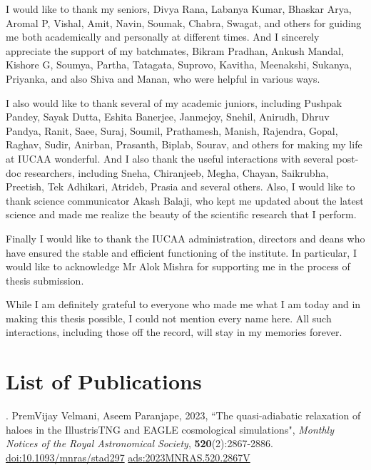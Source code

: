 \documentclass[a4paper, 12pt, oneside]{Thesis}  %
\newcommand{\doi}[1]{\href{https://doi.org/#1}{doi:#1}}
\begin{document}
{I would like to thank my seniors, Divya Rana, Labanya Kumar, Bhaskar Arya, Aromal P, Vishal, Amit, Navin, Soumak, Chabra, Swagat, and others for guiding me both academically and personally at different times. And I sincerely appreciate the support of my batchmates, Bikram Pradhan, Ankush Mandal, Kishore G, Soumya, Partha, Tatagata, Suprovo, Kavitha, Meenakshi, Sukanya, Priyanka, and also Shiva and Manan, who were helpful in various ways.

I also would like to thank several of my academic juniors, including Pushpak Pandey, Sayak Dutta, Eshita Banerjee, Janmejoy, Snehil, Anirudh, Dhruv Pandya, Ranit, Saee, Suraj, Soumil, Prathamesh, Manish, Rajendra, Gopal, Raghav, Sudir, Anirban, Prasanth, Biplab, Sourav, and others for making my life at IUCAA wonderful. And I also thank the useful interactions with several post-doc researchers, including Sneha, Chiranjeeb, Megha, Chayan, Saikrubha, Preetish, Tek Adhikari, Atrideb, Prasia and several others.
Also, I would like to thank science communicator Akash Balaji, who kept me updated about the latest science and made me realize the beauty of the scientific research that I perform.

Finally I would like to thank the IUCAA administration, directors and deans who have ensured the stable and efficient functioning of the institute. In particular, I would like to acknowledge Mr Alok Mishra for supporting me in the process of thesis submission.

While I am definitely grateful to everyone who made me what I am today and in making this thesis possible, I could not mention every name here. All such interactions, including those off the record, will stay in my memories forever.

}
\clearpage  %

\pagestyle{fancy}  %

\section*{List of Publications}

. PremVijay Velmani, Aseem Paranjape, 2023, ``The quasi-adiabatic relaxation of haloes in the IllustrisTNG and EAGLE cosmological simulations", \textit{Monthly Notices of the Royal Astronomical Society}, 
\textbf{520}(2):2867-2886. 
\doi{10.1093/mnras/stad297}
\href{https://ui.adsabs.harvard.edu/abs/2023MNRAS.520.2867V}{ads:2023MNRAS.520.2867V}

\vspace{0.5cm}
\end{document}
